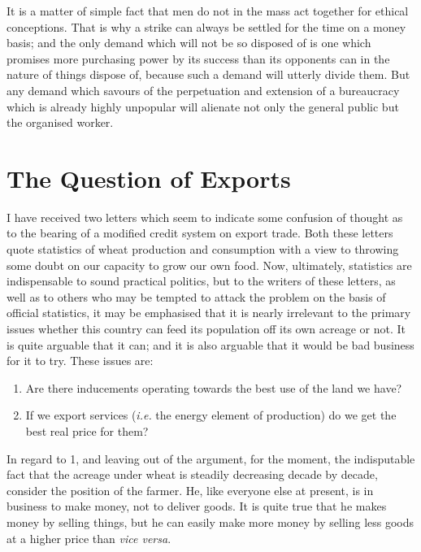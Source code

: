 \documentclass{book}
\begin{document}
It is a matter of simple fact that men do not in the mass act together for ethical conceptions. That is why a strike can always be settled for the time on a money basis; and the only demand which will not be so disposed of is one which promises more purchasing power by its success than its opponents can in the nature of things dispose of, because such a demand will utterly divide them. But any demand which savours of the perpetuation and extension of a bureaucracy which is already highly unpopular will alienate not only the general public but the organised worker.

\chapter{The Question of Exports}
\label{chapter-7}
I have received two letters which seem to indicate some confusion of thought as to the bearing of a modified credit system on export trade. Both these letters quote statistics of wheat production and consumption with a view to throwing some doubt on our capacity to grow our own food. Now, ultimately, statistics are indispensable to sound practical politics, but to the writers of these letters, as well as to others who may be tempted to attack the problem on the basis of official statistics, it may be emphasised that it is nearly irrelevant to the primary issues whether this country can feed its population off its own acreage or not. It is quite arguable that it can; and it is also arguable that it would be bad business for it to try. These issues are:

\begin{enumerate}
	\item Are there inducements operating towards the best use of the land we have?


	\item If we export services (\emph{i.e.} the energy element of production) do we get the best real price for them?



\end{enumerate}
In regard to 1, and leaving out of the argument, for the moment, the indisputable fact that the acreage under wheat is steadily decreasing decade by decade, consider the position of the farmer. He, like everyone else at present, is in business to make money, not to deliver goods. It is quite true that he makes money by selling things, but he can easily make more money by selling less goods at a higher price than \emph{vice versa}.
\end{document}
